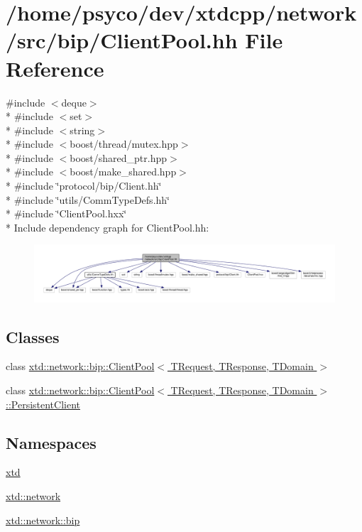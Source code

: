 \hypertarget{ClientPool_8hh}{}\section{/home/psyco/dev/xtdcpp/network/src/bip/\+Client\+Pool.hh File Reference}
\label{ClientPool_8hh}
{\ttfamily \#include $<$deque$>$}\\*
{\ttfamily \#include $<$set$>$}\\*
{\ttfamily \#include $<$string$>$}\\*
{\ttfamily \#include $<$boost/thread/mutex.\+hpp$>$}\\*
{\ttfamily \#include $<$boost/shared\+\_\+ptr.\+hpp$>$}\\*
{\ttfamily \#include $<$boost/make\+\_\+shared.\+hpp$>$}\\*
{\ttfamily \#include \char`\"{}protocol/bip/\+Client.\+hh\char`\"{}}\\*
{\ttfamily \#include \char`\"{}utils/\+Comm\+Type\+Defs.\+hh\char`\"{}}\\*
{\ttfamily \#include \char`\"{}Client\+Pool.\+hxx\char`\"{}}\\*
Include dependency graph for Client\+Pool.\+hh\+:
\nopagebreak
\begin{figure}[H]
\begin{center}
\leavevmode
\includegraphics[width=350pt]{ClientPool_8hh__incl}
\end{center}
\end{figure}
\subsection*{Classes}
\begin{DoxyCompactItemize}
\item 
class \hyperlink{classxtd_1_1network_1_1bip_1_1ClientPool}{xtd\+::network\+::bip\+::\+Client\+Pool$<$ T\+Request, T\+Response, T\+Domain $>$}
\item 
class \hyperlink{classxtd_1_1network_1_1bip_1_1ClientPool_1_1PersistentClient}{xtd\+::network\+::bip\+::\+Client\+Pool$<$ T\+Request, T\+Response, T\+Domain $>$\+::\+Persistent\+Client}
\end{DoxyCompactItemize}
\subsection*{Namespaces}
\begin{DoxyCompactItemize}
\item 
 \hyperlink{namespacextd}{xtd}
\item 
 \hyperlink{namespacextd_1_1network}{xtd\+::network}
\item 
 \hyperlink{namespacextd_1_1network_1_1bip}{xtd\+::network\+::bip}
\end{DoxyCompactItemize}
